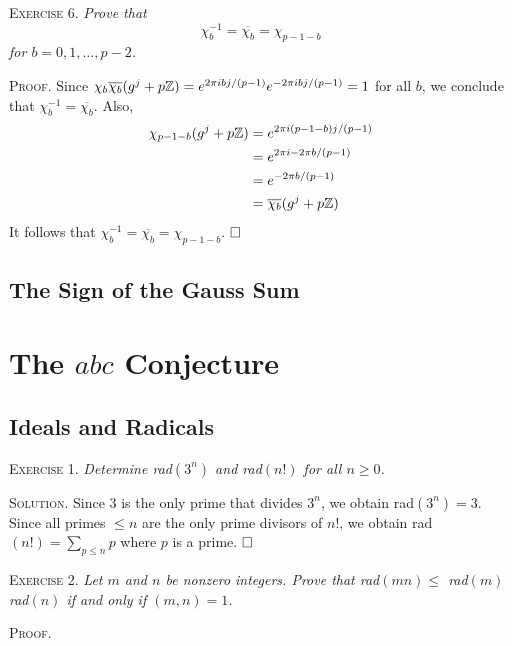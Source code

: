\documentclass[11pt, leqno]{article}
\newcommand{\done}{\ensuremath{\hfill\square}}
\begin{document}
\textsc{Exercise 6}. \emph{Prove that 
\begin{displaymath}
  \chi_b^{-1} = \overline{\chi_b} = \chi_{p-1-b}
\end{displaymath}
for $b = 0,1, \ldots, p-2$.}

\textsc{Proof}. Since $\chi_b \overline{\chi_b}(g^j + p\mathbb{Z}) = e^{2\pi i bj/(p-1)} e^{-2\pi i bj/(p-1)} = 1$ for all $b$, we conclude that $\chi_b^{-1} = \overline{\chi_b}$. Also, 
\begin{align*}
  \chi_{p-1-b}(g^j + p\mathbb{Z}) &= e^{2\pi i (p-1-b)j/(p-1)} \\
                          &= e^{2\pi i - 2\pi b/(p-1)} \\
                          &= e^{- 2\pi b/(p-1)} \\
                          &= \overline{\chi_b}(g^j + p\mathbb{Z})
\end{align*}
It follows that $\chi_b^{-1} = \overline{\chi_b} = \chi_{p-1-b}$. \done

\subsection{The Sign of the Gauss Sum}

\clearpage
\section{The $abc$ Conjecture}

\subsection{Ideals and Radicals}

\textsc{Exercise 1}. \emph{Determine \emph{rad}$(3^n)$ and \emph{rad}$(n!)$ for all $n \geq 0$.}

\textsc{Solution}. Since $3$ is the only prime that divides $3^n$, we obtain rad$(3^n) = 3$. Since all primes $\leq n$ are the only prime divisors of $n!$, we obtain rad$(n!) = \sum_{p\leq n} p$ where $p$ is a prime. \done

\textsc{Exercise 2}. \emph{Let $m$ and $n$ be nonzero integers. Prove that \emph{rad}$(mn) \leq $ \emph{rad}$(m)$\emph{rad}$(n)$ if and only if $(m,n) = 1$.}

\textsc{Proof}. 
\end{document}
